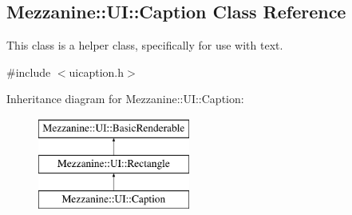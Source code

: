 \hypertarget{classMezzanine_1_1UI_1_1Caption}{
\subsection{Mezzanine::UI::Caption Class Reference}
\label{classMezzanine_1_1UI_1_1Caption}
}


This class is a helper class, specifically for use with text.  




{\ttfamily \#include $<$uicaption.h$>$}

Inheritance diagram for Mezzanine::UI::Caption:\begin{figure}[H]
\begin{center}
\leavevmode
\includegraphics[height=3.000000cm]{classMezzanine_1_1UI_1_1Caption}
\end{center}
\end{figure}
